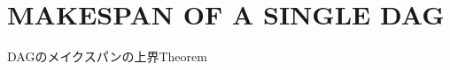 
\section{MAKESPAN OF A SINGLE DAG}
\label{sec: MAKESPAN OF A SINGLE DAG}

\begin{frame}{DAGのメイクスパンの上界Theorem}
\end{frame}
